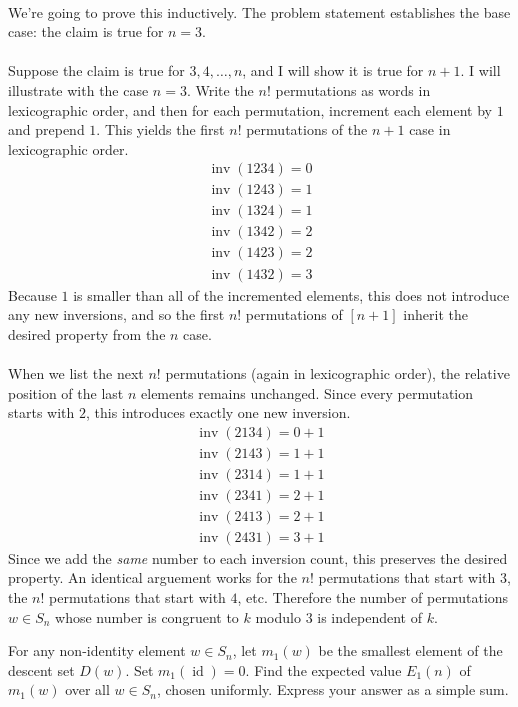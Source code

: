 \documentclass{article}
\newenvironment{problem}[2][Problem]{\begin{trivlist}
\item[\hskip \labelsep {\bfseries #1}\hskip \labelsep {\bfseries #2.}]}{\end{trivlist}}
\newenvironment{solution}[1][Solution.]{\begin{trivlist}
\item[\hskip \labelsep {\bfseries #1}]}{\end{trivlist}}
\begin{document}
\begin{solution} \text{} \\
  We're going to prove this inductively. The problem statement establishes the
  base case: the claim is true for $n=3$.
  \\~\\
  Suppose the claim is true for $3, 4, \hdots, n$, and I will show it is true
  for $n + 1$. I will illustrate with the case $n=3$.
  Write the $n!$ permutations as words in lexicographic order, and then for each
  permutation, increment each element by $1$ and prepend $1$. This yields the
  first $n!$ permutations of the $n + 1$ case in lexicographic order.
  \begin{align*}
    \operatorname{inv}(1234) = 0 \\
    \operatorname{inv}(1243) = 1 \\
    \operatorname{inv}(1324) = 1 \\
    \operatorname{inv}(1342) = 2 \\
    \operatorname{inv}(1423) = 2 \\
    \operatorname{inv}(1432) = 3
  \end{align*}
  Because $1$ is smaller than all of the incremented elements, this does not
  introduce any new inversions, and so the first $n!$ permutations of $[n + 1]$
  inherit the desired property from the $n$ case.
  \\~\\
  When we list the next $n!$ permutations (again in lexicographic order), the
  relative position of the last $n$ elements remains unchanged. Since every
  permutation starts with $2$, this introduces exactly one new inversion.
  \begin{align*}
    \operatorname{inv}(2134) = 0 + 1 \\
    \operatorname{inv}(2143) = 1 + 1 \\
    \operatorname{inv}(2314) = 1 + 1 \\
    \operatorname{inv}(2341) = 2 + 1 \\
    \operatorname{inv}(2413) = 2 + 1 \\
    \operatorname{inv}(2431) = 3 + 1
  \end{align*}
  Since we add the \textit{same} number to each inversion count, this preserves
  the desired property.
  An identical arguement works for the $n!$ permutations that start with $3$,
  the $n!$ permutations that start with $4$, etc.
  Therefore the number of permutations $w \in S_n$ whose number is congruent to $k$
  modulo $3$ is independent of $k$.
\end{solution}
\pagebreak
\begin{problem}{2} $ $ \\
  For any non-identity element $w \in S_n$, let $m_1(w)$ be the smallest element
  of the descent set $D(w)$. Set $m_1(\operatorname{id}) = 0$. Find the expected value
  $E_1(n)$ of $m_1(w)$ over all $w \in S_n$, chosen uniformly. Express your
  answer as a simple sum.
\end{problem}
\end{document}
